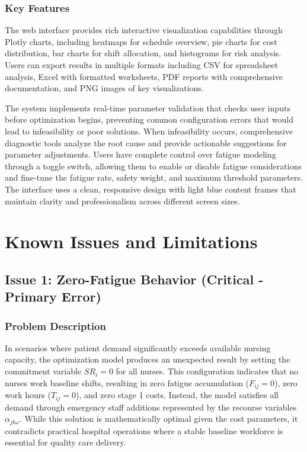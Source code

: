 \documentclass[11pt,letterpaper]{article}
\begin{document}
\subsubsection{Key Features}
The web interface provides rich interactive visualization capabilities through Plotly charts, including heatmaps for schedule overview, pie charts for cost distribution, bar charts for shift allocation, and histograms for risk analysis. Users can export results in multiple formats including CSV for spreadsheet analysis, Excel with formatted worksheets, PDF reports with comprehensive documentation, and PNG images of key visualizations.

The system implements real-time parameter validation that checks user inputs before optimization begins, preventing common configuration errors that would lead to infeasibility or poor solutions. When infeasibility occurs, comprehensive diagnostic tools analyze the root cause and provide actionable suggestions for parameter adjustments. Users have complete control over fatigue modeling through a toggle switch, allowing them to enable or disable fatigue considerations and fine-tune the fatigue rate, safety weight, and maximum threshold parameters. The interface uses a clean, responsive design with light blue content frames that maintain clarity and professionalism across different screen sizes.

\section{Known Issues and Limitations}

\subsection{Issue 1: Zero-Fatigue Behavior (Critical - Primary Error)}

\subsubsection{Problem Description}
In scenarios where patient demand significantly exceeds available nursing capacity, the optimization model produces an unexpected result by setting the commitment variable $SR_i = 0$ for all nurses. This configuration indicates that no nurses work baseline shifts, resulting in zero fatigue accumulation ($F_{ij} = 0$), zero work hours ($T_{ij} = 0$), and zero stage 1 costs. Instead, the model satisfies all demand through emergency staff additions represented by the recourse variables $\alpha_{jk\omega}$. While this solution is mathematically optimal given the cost parameters, it contradicts practical hospital operations where a stable baseline workforce is essential for quality care delivery.
\end{document}
